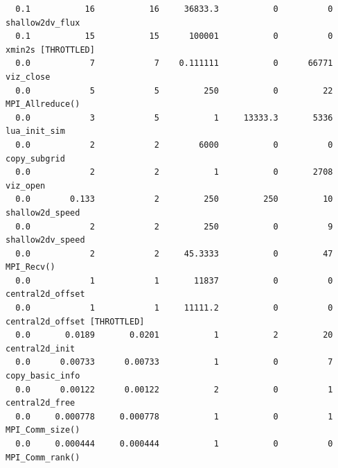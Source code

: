 \documentclass{article}
\begin{document}
{\begin{verbatim}
  0.1           16           16     36833.3           0          0 shallow2dv_flux 
  0.1           15           15      100001           0          0 xmin2s [THROTTLED]
  0.0            7            7    0.111111           0      66771 viz_close 
  0.0            5            5         250           0         22 MPI_Allreduce() 
  0.0            3            5           1     13333.3       5336 lua_init_sim 
  0.0            2            2        6000           0          0 copy_subgrid 
  0.0            2            2           1           0       2708 viz_open 
  0.0        0.133            2         250         250         10 shallow2d_speed 
  0.0            2            2         250           0          9 shallow2dv_speed 
  0.0            2            2     45.3333           0         47 MPI_Recv() 
  0.0            1            1       11837           0          0 central2d_offset 
  0.0            1            1     11111.2           0          0 central2d_offset [THROTTLED]
  0.0       0.0189       0.0201           1           2         20 central2d_init 
  0.0      0.00733      0.00733           1           0          7 copy_basic_info 
  0.0      0.00122      0.00122           2           0          1 central2d_free 
  0.0     0.000778     0.000778           1           0          1 MPI_Comm_size() 
  0.0     0.000444     0.000444           1           0          0 MPI_Comm_rank() 
\end{verbatim}
}
\end{document}
